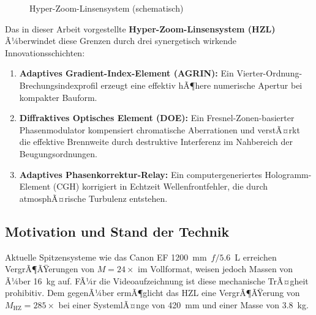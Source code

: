 ﻿\documentclass[12pt,a4paper]{article}
\theoremstyle{definition}
\newcommand{\HZ}{\mathrm{HZ}}
\begin{document}
\begin{figure}[h]
		\label{fig:hzl-system-schema}
		\caption{Hyper-Zoom-Linsensystem (schematisch)}
	\end{figure}
	
	Das in dieser Arbeit vorgestellte \textbf{Hyper-Zoom-Linsensystem (HZL)}
	Ã¼berwindet diese Grenzen durch drei synergetisch wirkende Innovations\-schichten:
	
	\begin{enumerate}[label=(\roman*)]
		\item \textbf{Adaptives Gradient-Index-Element (AGRIN):} Ein Vierter-Ordnung-
		Brechungsindexprofil erzeugt eine effektiv hÃ¶here numerische Apertur bei
		kompakter Bauform.
		\item \textbf{Diffraktives Optisches Element (DOE):} Ein Fresnel-Zonen-basierter
		Phasenmodulator kompensiert chromatische Aberrationen und verstÃ¤rkt die
		effektive Brennweite durch destruktive Interferenz im Nahbereich der
		Beugungsordnungen.
		\item \textbf{Adaptives Phasenkorrektur-Relay:} Ein computergeneriertes
		Hologramm-Ele\-ment (CGH) korrigiert in Echtzeit Wellenfrontfehler, die
		durch atmosphÃ¤rische Turbulenz entstehen.
	\end{enumerate}
	
	\subsection{Motivation und Stand der Technik}
	
	Aktuelle Spitzensysteme wie das Canon EF \SI{1200}{\milli\metre}~$f/5.6$~L
	erreichen VergrÃ¶ÃŸerungen von $M = 24\times$ im Vollformat, weisen jedoch Massen
	von Ã¼ber \SI{16}{\kilogram} auf. FÃ¼r die Videoaufzeichnung ist diese
	mechanische TrÃ¤gheit prohibitiv. Dem gegenÃ¼ber ermÃ¶glicht das HZL eine
	VergrÃ¶ÃŸerung von $M_\HZ = 285\times$ bei einer SystemlÃ¤nge von
	\SI{420}{\milli\metre} und einer Masse von \SI{3.8}{\kilogram}.
	
\end{document}
